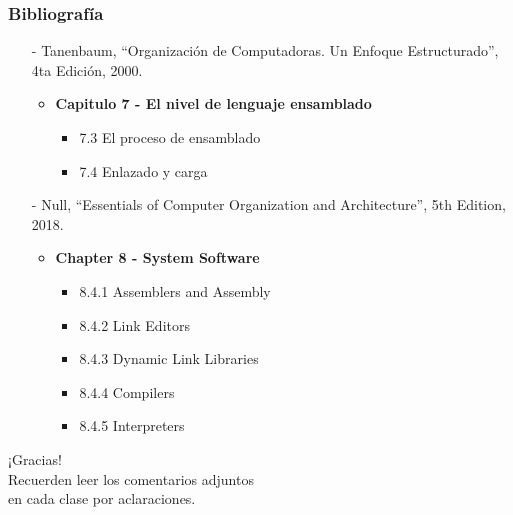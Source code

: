 \documentclass[aspectratio=169]{beamer}
\begin{document}
\begin{frame}[fragile]
    \frametitle{Bibliografía}
    \begin{itemize}
     \setlength\itemsep{0.5cm}
    \item[-] \small Tanenbaum, “Organización de Computadoras. Un Enfoque Estructurado”, 4ta Edición, 2000.\\
    \begin{itemize}
     \item \textbf{Capitulo 7 - El nivel de lenguaje ensamblado}
     \begin{itemize} 
        \item 7.3 El proceso de ensamblado
        \item 7.4 Enlazado y carga
     \end{itemize}
    \end{itemize}
    \item[-] \small Null, “Essentials of Computer Organization and Architecture”, 5th Edition, 2018.\\
    \begin{itemize}
    \item \textbf{Chapter 8 - System Software}
     \begin{itemize} 
        \item 8.4.1 Assemblers and Assembly
        \item 8.4.2 Link Editors
        \item 8.4.3 Dynamic Link Libraries
        \item 8.4.4 Compilers
        \item 8.4.5 Interpreters
     \end{itemize}
    \end{itemize}
    \end{itemize}
\end{frame}

\begin{frame}[plain]
    \begin{center}
    \vspace{2cm}
    \huge ¡Gracias!\\
    \vspace{2cm}
    \normalsize Recuerden leer los comentarios adjuntos\\ en cada clase por aclaraciones.
    \end{center}
\end{frame}
\end{document}
